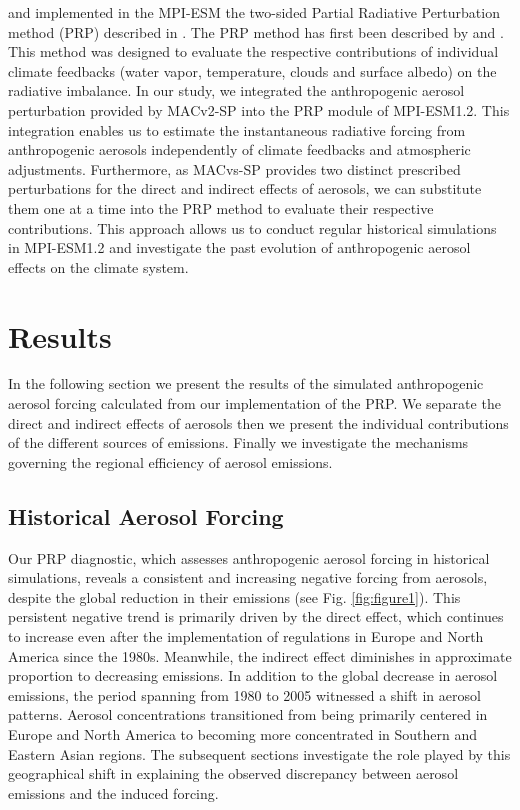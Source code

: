 \documentclass[draft]{agujournal2019}
\begin{document}
       and  implemented in the MPI-ESM the two-sided Partial Radiative Perturbation method (PRP) described in . The PRP method has first been described by  and . This method was designed to evaluate the respective contributions of individual climate feedbacks (water vapor, temperature, clouds and surface albedo) on the radiative imbalance. In our study, we integrated the anthropogenic aerosol perturbation provided by MACv2-SP into the PRP module of MPI-ESM1.2. This integration enables us to estimate the instantaneous radiative forcing from anthropogenic aerosols independently of climate feedbacks and atmospheric adjustments. Furthermore, as MACvs-SP provides two distinct prescribed perturbations for the direct and indirect effects of aerosols, we can substitute them one at a time into the PRP method to evaluate their respective contributions. This approach allows us to conduct regular historical simulations in MPI-ESM1.2 and investigate the past evolution of anthropogenic aerosol effects on the climate system.

\section{Results}
      In the following section we present the results of the simulated anthropogenic aerosol forcing calculated from our implementation of the PRP. We separate the direct and indirect effects of aerosols then we present the individual contributions of the different sources of emissions. Finally we investigate the mechanisms governing the regional efficiency of aerosol emissions.

      \subsection{Historical Aerosol Forcing}
            Our PRP diagnostic, which assesses anthropogenic aerosol forcing in historical simulations, reveals a consistent and increasing negative forcing from aerosols, despite the global reduction in their emissions (see Fig. \ref{fig:figure1}). This persistent negative trend is primarily driven by the direct effect, which continues to increase even after the implementation of regulations in Europe and North America since the 1980s. Meanwhile, the indirect effect diminishes in approximate proportion to decreasing emissions.
            In addition to the global decrease in aerosol emissions, the period spanning from 1980 to 2005 witnessed a shift in aerosol patterns. Aerosol concentrations transitioned from being primarily centered in Europe and North America to becoming more concentrated in Southern and Eastern Asian regions.
            The subsequent sections investigate the role played by this geographical shift in explaining the observed discrepancy between aerosol emissions and the induced forcing.
\end{document}
